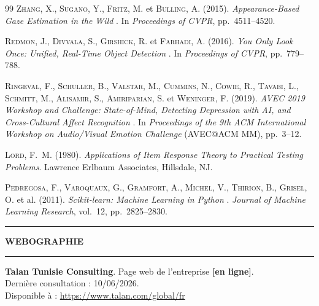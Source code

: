 \begin{thebibliography}{99}
\textsc{Zhang}, X., \textsc{Sugano}, Y., \textsc{Fritz}, M. et \textsc{Bulling}, A.
(2015).
\og \textit{Appearance-Based Gaze Estimation in the Wild} \fg{}.
In \textit{Proceedings of CVPR}, pp.~4511--4520.

\textsc{Redmon}, J., \textsc{Divvala}, S., \textsc{Girshick}, R. et \textsc{Farhadi}, A.
(2016).
\og \textit{You Only Look Once: Unified, Real-Time Object Detection} \fg{}.
In \textit{Proceedings of CVPR}, pp.~779--788.

\textsc{Ringeval}, F., \textsc{Schuller}, B., \textsc{Valstar}, M., \textsc{Cummins}, N.,
\textsc{Cowie}, R., \textsc{Tavabi}, L., \textsc{Schmitt}, M., \textsc{Alisamir}, S.,
\textsc{Amiriparian}, S. et \textsc{Weninger}, F.
(2019).
\og \textit{AVEC 2019 Workshop and Challenge: State-of-Mind, Detecting Depression with AI,
and Cross-Cultural Affect Recognition} \fg{}.
In \textit{Proceedings of the 9th ACM International Workshop on Audio/Visual Emotion Challenge}
(AVEC@ACM MM), pp.~3--12.

\textsc{Lord}, F.~M.
(1980).
\textit{Applications of Item Response Theory to Practical Testing Problems}.
Lawrence Erlbaum Associates, Hillsdale, NJ.

\textsc{Pedregosa}, F., \textsc{Varoquaux}, G., \textsc{Gramfort}, A., \textsc{Michel}, V.,
\textsc{Thirion}, B., \textsc{Grisel}, O. et al.
(2011).
\og \textit{Scikit-learn: Machine Learning in Python} \fg{}.
\textit{Journal of Machine Learning Research}, vol.~12, pp.~2825--2830.

\bigskip
\noindent\rule{\textwidth}{0.4pt}
\begin{center}
{\large\bfseries WEBOGRAPHIE}
\end{center}
\noindent\rule{\textwidth}{0.4pt}
\bigskip

\textbf{Talan Tunisie Consulting}. Page web de l'entreprise \textbf{[en ligne]}.\\
Dernière consultation : 10/06/2026.\\
Disponible à : \url{https://www.talan.com/global/fr}


\end{thebibliography}
